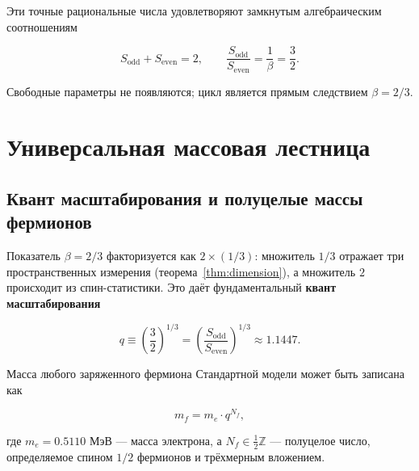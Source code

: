 \documentclass[12pt,a4paper]{article}
\theoremstyle{remark}
\begin{document}
	Эти точные рациональные числа удовлетворяют замкнутым алгебраическим соотношениям
	
	\begin{equation}
		\boxed{S_{\mathrm{odd}} + S_{\mathrm{even}} = 2, \qquad
			\frac{S_{\mathrm{odd}}}{S_{\mathrm{even}}} = \frac{1}{\beta} = \frac{3}{2}}.
		\label{eq:algebraic-loop}
	\end{equation}
	
	Свободные параметры не появляются; цикл является прямым следствием \(\beta = 2/3\).
	
	\section{Универсальная массовая лестница}
	\label{sec:mass-ladder}
	
	\subsection{Квант масштабирования и полуцелые массы фермионов}
	
	Показатель \(\beta = 2/3\) факторизуется как \(2 \times (1/3)\): множитель \(1/3\) отражает три пространственных измерения (теорема~\ref{thm:dimension}), а множитель \(2\) происходит из спин-статистики. Это даёт фундаментальный \textbf{квант масштабирования}
	
	\begin{equation}
		q \equiv \left(\frac{3}{2}\right)^{1/3}
		= \left(\frac{S_{\mathrm{odd}}}{S_{\mathrm{even}}}\right)^{1/3} \approx 1.1447.
	\end{equation}
	
	Масса любого заряженного фермиона Стандартной модели может быть записана как
	
	\begin{equation}
		\boxed{m_f = m_e \cdot q^{N_f}},
		\label{eq:mass-quantization}
	\end{equation}
	
	где \(m_e = 0.5110\) МэВ --- масса электрона, а \(N_f \in \frac{1}{2}\mathbb{Z}\) --- полуцелое число, определяемое спином \(1/2\) фермионов и трёхмерным вложением.
	
\end{document}
